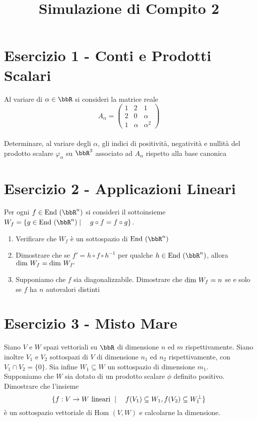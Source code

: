 \documentclass[a4paper,NoNotes,GeneralMath]{stdmdoc}
\begin{document}
	\newpage
	\title{Simulazione di Compito 2}
	
	\section*{Esercizio 1 - Conti e Prodotti Scalari}
		Al variare di $\alpha \in\bbR$ si consideri la matrice reale $$ A_\alpha = \left( \begin{array}{ccc} 1 & 2 & 1 \\ 2 & 0 & \alpha \\ 1 & \alpha & \alpha^2 \end{array} \right) $$ \\
	Determinare, al variare degli $\alpha$, gli indici di positività, negatività e nullità del prodotto scalare $\varphi_\alpha$ su $\bbR^3$ associato ad $A_\alpha$ rispetto alla base canonica

	\section*{Esercizio 2 - Applicazioni Lineari}
	Per ogni $f \in \End(\bbR^n)$ si consideri il sottoinsieme $W_f = \{ g\in \End(\bbR^n) \mid \quad g\circ f = f \circ g \}$.
	\begin{enumerate}
		\item Verificare che $W_f$ è un sottospazio di $\End(\bbR^n)$
		\item Dimostrare che se $f' = h \circ f \circ h^{-1}$ per qualche $h\in\End(\bbR^n)$, allora $\mbox{dim } W_f = \mbox{dim } W_{f'}$
		\item Supponiamo che $f$ sia diagonalizzabile. Dimostrare che $\mbox{dim } W_f = n$ se e solo se $f$ ha $n$ autovalori distinti
	\end{enumerate}

	\section*{Esercizio 3 - Misto Mare}
	Siano $V$ e $W$ spazi vettoriali su $\bbR$ di dimensione $n$ ed $m$ rispettivamente. Siano inoltre $V_1$ e $V_2$ sottospazi di $V$ di dimensione $n_1$ ed $n_2$ rispettivamente, con $V_1 \cap V_2 = \{0\}$. Sia infine $W_1 \subseteq W$ un sottospazio di dimensione $m_1$. \\ Supponiamo che $W$ sia dotato di un prodotto scalare $\phi$ definito positivo. Dimostrare che l'insieme $$\{f: V\rightarrow W \text{ lineari } \mid \quad f(V_1) \subseteq W_1, f(V_2) \subseteq W_1^\bot \}$$ è un sottospazio vettoriale di $\text{Hom }(V,W)$ e calcolarne la dimensione.
\end{document}
